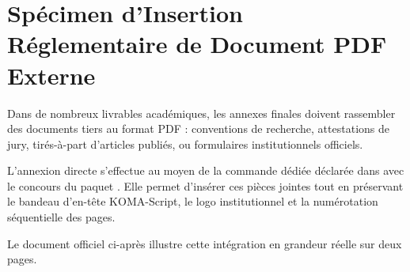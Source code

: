 \chapter{Spécimen d'Insertion Réglementaire de Document PDF Externe}
\label{anx:document-externe}

Dans de nombreux livrables académiques, les annexes finales doivent rassembler des documents tiers
au format PDF : conventions de recherche, attestations de jury, tirés-à-part d'articles publiés,
ou formulaires institutionnels officiels.

L'annexion directe s'effectue au moyen de la commande dédiée 
déclarée dans  avec le concours du paquet .
Elle permet d'insérer ces pièces jointes tout en préservant le bandeau d'en-tête KOMA-Script,
le logo institutionnel et la numérotation séquentielle des pages.

Le document officiel ci-après illustre cette intégration en grandeur réelle sur deux pages.

